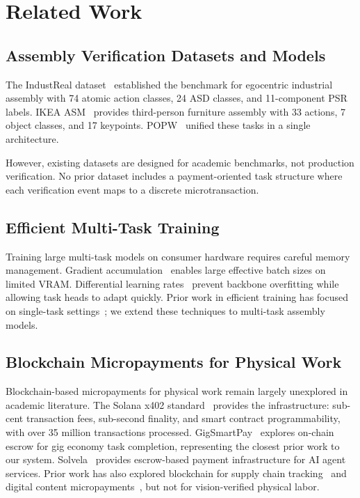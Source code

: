 \documentclass[10pt,twocolumn]{article}
\newcommand{\popw}{POPW}
\begin{document}
\section{Related Work}
\label{sec:related}

\subsection{Assembly Verification Datasets and Models}

The IndustReal dataset~\cite{schoonbeek2024industreal} established the benchmark for egocentric industrial assembly with 74 atomic action classes, 24 ASD classes, and 11-component PSR labels. IKEA ASM~\cite{benshabat2021ikea} provides third-person furniture assembly with 33 actions, 7 object classes, and 17 keypoints. \popw{}~\cite{popw2026} unified these tasks in a single architecture.

However, existing datasets are designed for academic benchmarks, not production verification. No prior dataset includes a payment-oriented task structure where each verification event maps to a discrete microtransaction.

\subsection{Efficient Multi-Task Training}

Training large multi-task models on consumer hardware requires careful memory management. Gradient accumulation~\cite{chen2016training} enables large effective batch sizes on limited VRAM. Differential learning rates~\cite{howard2018universal} prevent backbone overfitting while allowing task heads to adapt quickly. Prior work in efficient training has focused on single-task settings~\cite{liu2022convnet,tan2019efficientnet}; we extend these techniques to multi-task assembly models.

\subsection{Blockchain Micropayments for Physical Work}

Blockchain-based micropayments for physical work remain largely unexplored in academic literature. The Solana x402 standard~\cite{solana2024x402} provides the infrastructure: sub-cent transaction fees, sub-second finality, and smart contract programmability, with over 35 million transactions processed. GigSmartPay~\cite{gigsmartpay2025} explores on-chain escrow for gig economy task completion, representing the closest prior work to our system. Solvela~\cite{solvela2025} provides escrow-based payment infrastructure for AI agent services. Prior work has also explored blockchain for supply chain tracking~\cite{chang2020blockchain} and digital content micropayments~\cite{li2020micropayment}, but not for vision-verified physical labor.
\end{document}
